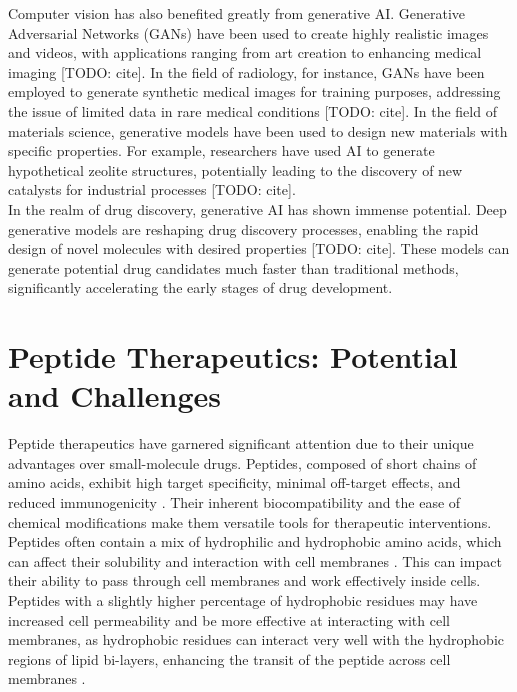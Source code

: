Computer vision has also benefited greatly from generative AI. Generative Adversarial Networks (GANs) have been used to create highly realistic images and videos, with applications ranging from art creation to enhancing medical imaging [TODO: cite]. In the field of radiology, for instance, GANs have been employed to generate synthetic medical images for training purposes, addressing the issue of limited data in rare medical conditions [TODO: cite]. In the field of materials science, generative models have been used to design new materials with specific properties. For example, researchers have used AI to generate hypothetical zeolite structures, potentially leading to the discovery of new catalysts for industrial processes [TODO: cite]. \\

In the realm of drug discovery, generative AI has shown immense potential. Deep generative models are reshaping drug discovery processes, enabling the rapid design of novel molecules with desired properties [TODO: cite]. These models can generate potential drug candidates much faster than traditional methods, significantly accelerating the early stages of drug development.

\section{Peptide Therapeutics: Potential and Challenges} 
Peptide therapeutics have garnered significant attention due to their unique advantages over
small-molecule drugs. Peptides, composed of short chains of amino acids, exhibit high target
specificity, minimal off-target effects, and reduced immunogenicity \cite{wang2022therapeutic}.
Their inherent biocompatibility and the ease of chemical modifications make them versatile tools for
therapeutic interventions. Peptides often contain a mix of hydrophilic and hydrophobic amino acids,
which can affect their solubility and interaction with cell membranes \cite{madani2011mech}. This
can impact their ability to pass through cell membranes and work effectively inside cells. Peptides
with a slightly higher percentage of hydrophobic residues may have increased cell permeability
\cite{madani2011mech} and be more effective at interacting with cell membranes, as hydrophobic
residues can interact very well with the hydrophobic regions of lipid bi-layers, enhancing the
transit of the peptide across cell membranes \cite{madani2011mech}. \\

